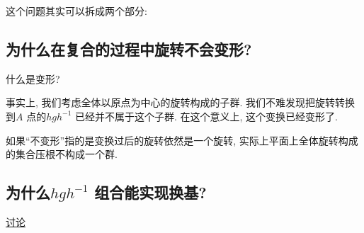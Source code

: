 \documentclass{article}
\begin{document}
这个问题其实可以拆成两个部分:
\subsection{为什么在复合的过程中旋转不会变形?}
什么是变形?

事实上, 我们考虑全体以原点为中心的旋转构成的子群. 我们不难发现把旋转转换到\(A\) 点的\(hgh^{-1}\)
已经并不属于这个子群. 在这个意义上, 这个变换已经变形了.

如果``不变形''指的是变换过后的旋转依然是一个旋转, 实际上平面上全体旋转构成的集合压根不构成一个群.

\subsection{为什么\(hgh^{-1}\) 组合能实现换基?}

\href{https://math.stackexchange.com/questions/11971/intuition-behind-conjugation-in-group-theory}{讨论}
\end{document}
